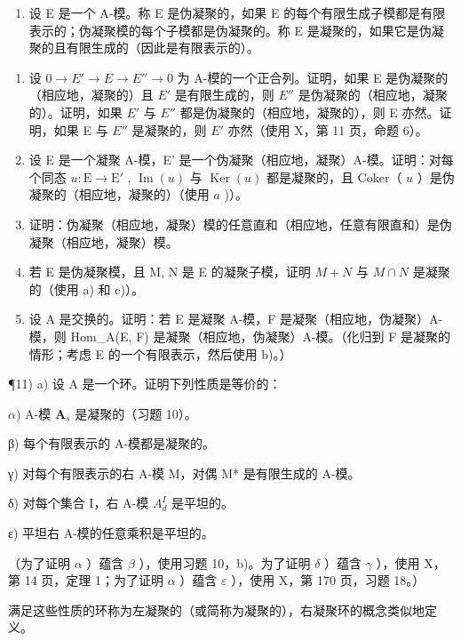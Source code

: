 \begin{enumerate}
\def\labelenumi{\arabic{enumi})}
\setcounter{enumi}{9}
\tightlist
\item
  设 E 是一个 A-模。称 E 是伪凝聚的，如果 E 的每个有限生成子模都是有限表示的；伪凝聚模的每个子模都是伪凝聚的。称 E 是凝聚的，如果它是伪凝聚的且有限生成的（因此是有限表示的）。
\end{enumerate}

\begin{enumerate}
\def\labelenumi{\alph{enumi})}
\item
  设 \(0 \to E' \to E \to E'' \to 0\) 为 A-模的一个正合列。证明，如果 E 是伪凝聚的（相应地，凝聚的）且 \(E'\) 是有限生成的，则 \(E''\) 是伪凝聚的（相应地，凝聚的）。证明，如果 \(E'\) 与 \(E''\) 都是伪凝聚的（相应地，凝聚的），则 E 亦然。证明，如果 E 与 \(E''\) 是凝聚的，则 \(E'\) 亦然（使用 X，第 11 页，命题 6）。
\item
  设 E 是一个凝聚 A-模，E' 是一个伪凝聚（相应地，凝聚）A-模。证明：对每个同态 \(u: \mathrm{E} \to \mathrm{E}'\) , \(\operatorname{Im}(u)\) 与 \(\operatorname{Ker}(u)\) 都是凝聚的，且 Coker（ \(u\) ）是伪凝聚的（相应地，凝聚的）（使用 \(a\) )）。
\item
  证明：伪凝聚（相应地，凝聚）模的任意直和（相应地，任意有限直和）是伪凝聚（相应地，凝聚）模。
\item
  若 E 是伪凝聚模，且 M, N 是 E 的凝聚子模，证明 \(M + N\) 与 \(M \cap N\) 是凝聚的（使用 a) 和 c)）。
\item
  设 A 是交换的。证明：若 E 是凝聚 A-模，F 是凝聚（相应地，伪凝聚）A-模，则 Hom\_A(E, F) 是凝聚（相应地，伪凝聚）A-模。（化归到 F 是凝聚的情形；考虑 E 的一个有限表示，然后使用 b)。）
\end{enumerate}

¶11) a) 设 A 是一个环。证明下列性质是等价的：

\(\alpha)\) A-模 \(\mathbf{A}_s\) 是凝聚的（习题 10）。

β) 每个有限表示的 A-模都是凝聚的。

γ) 对每个有限表示的右 A-模 M，对偶 M* 是有限生成的 A-模。

δ) 对每个集合 I，右 A-模 \(A_{d}^{I}\) 是平坦的。

ε) 平坦右 A-模的任意乘积是平坦的。

（为了证明 \(\alpha\) ）蕴含 \(\beta\) ），使用习题 10，b)。为了证明 \(\delta\) ）蕴含 \(\gamma\) ），使用 X，第 14 页，定理 1；为了证明 \(\alpha\) ）蕴含 \(\varepsilon\) ），使用 X，第 170 页，习题 18。）

满足这些性质的环称为左凝聚的（或简称为凝聚的），右凝聚环的概念类似地定义。

